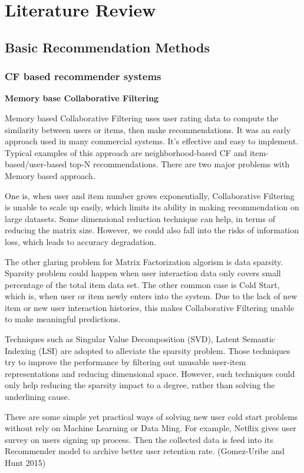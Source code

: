 \section{Literature Review}

\subsection{Basic Recommendation Methods}

\bigskip
\subsubsection{CF based recommender systems}

\bigskip
\textbf{Memory base Collaborative Filtering}

Memory based Collaborative Filtering uses user rating data to compute the similarity between users or items, then make recommendations. It was an early approach used in many commercial systems. It's effective and easy to implement. Typical examples of this approach are neighborhood-based CF and item-based/user-based top-N recommendations. There are two major problems with Memory based approach.  

One is, when user and item number grows exponentially, Collaborative Filtering is unable to scale up easily, which limits its ability in making recommendation on large datasets. Some dimensional reduction technique can help, in terms of reducing the matrix size. However, we could also fall into the risks of information loss, which leads to accuracy degradation.  

The other glaring problem for Matrix Factorization algorism is data sparsity. Sparsity problem could happen when user interaction data only covers small percentage of the total item data set. The other common case is Cold Start, which is, when user or item newly enters into the system. Due to the lack of new item or new user interaction histories, this makes Collaborative Filtering unable to make meaningful predictions.  

Techniques such as Singular Value Decomposition (SVD), Latent Semantic Indexing (LSI) are adopted to alleviate the sparsity problem. Those techniques try to improve the performance by filtering out unusable user-item representations and reducing dimensional space. However, such techniques could only help reducing the sparsity impact to a degree, rather than solving the underlining cause. 

There are some simple yet practical ways of solving new user cold start problems without rely on Machine Learning or Data Ming. For example, Netflix gives user survey on users signing up process. Then the collected data is feed into its Recommender model to archive better user retention rate. (Gomez-Uribe and Hunt 2015) 


